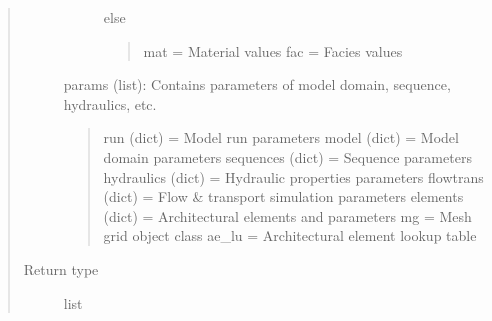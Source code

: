 \documentclass[letterpaper,10pt,english]{sphinxmanual}
\begin{document}
\begin{fulllineitems}
\begin{quote}
\begin{description}
\begin{description}
else
\begin{quote}

mat =                               Material values
fac =                               Facies values
\end{quote}

\end{description}

params (list):                  Contains parameters of model domain, sequence, hydraulics, etc.
\begin{quote}

run (dict) =                    Model run parameters
model (dict) =                  Model domain parameters
sequences (dict) =              Sequence parameters
hydraulics (dict) =             Hydraulic properties parameters
flowtrans (dict) =              Flow \& transport simulation parameters
elements (dict) =               Architectural elements and parameters
mg =                                    Mesh grid object class
ae\_lu =                                 Architectural element lookup table
\end{quote}


\item[{Return type}] \leavevmode
list

\end{description}\end{quote}

\end{fulllineitems}

\end{document}
